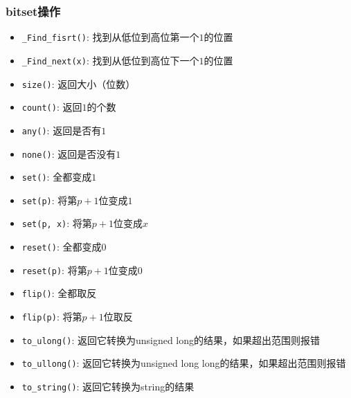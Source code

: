 \documentclass{ctexart}
\begin{document}
\subsubsection{bitset操作}
\begin{itemize}
    \item \texttt{\_Find\_fisrt()}: 找到从低位到高位第一个$1$的位置
    \item \texttt{\_Find\_next(x)}: 找到从低位到高位下一个$1$的位置
    \item \texttt{size()}: 返回大小（位数）
    \item \texttt{count()}: 返回$1$的个数
    \item \texttt{any()}: 返回是否有$1$
    \item \texttt{none()}: 返回是否没有$1$
    \item \texttt{set()}: 全都变成$1$
    \item \texttt{set(p)}: 将第$p + 1$位变成$1$
    \item \texttt{set(p, x)}: 将第$p + 1$位变成$x$
    \item \texttt{reset()}: 全都变成$0$
    \item \texttt{reset(p)}: 将第$p + 1$位变成$0$
    \item \texttt{flip()}: 全都取反
    \item \texttt{flip(p)}: 将第$p + 1$位取反
    \item \texttt{to\_ulong()}: 返回它转换为unsigned long的结果，如果超出范围则报错
    \item \texttt{to\_ullong()}: 返回它转换为unsigned long long的结果，如果超出范围则报错
    \item \texttt{to\_string()}: 返回它转换为string的结果
\end{itemize}
\end{document}
